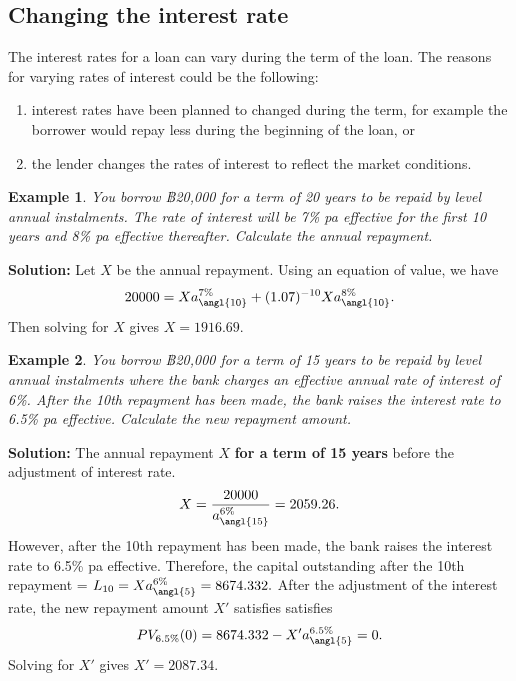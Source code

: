 \documentclass[
]{book}
\theoremstyle{definition}
\theoremstyle{definition}
\newtheorem{example}{Example}[chapter]
\theoremstyle{definition}
\theoremstyle{definition}
\theoremstyle{remark}
\begin{document}
\subsection{Changing the interest rate}\label{changing-the-interest-rate}

The interest rates for a loan can vary during the term of the loan. The
reasons for varying rates of interest could be the following:

\begin{enumerate}
\def\labelenumi{\arabic{enumi}.}
\item
  interest rates have been planned to changed during the term, for
  example the borrower would repay less during the beginning of the
  loan, or
\item
  the lender changes the rates of interest to reflect the market
  conditions.
\end{enumerate}

\begin{example}
\emph{You borrow ฿20,000 for a term of 20 years to be repaid by level annual
instalments. The rate of interest will be 7\% pa effective for the first
10 years and 8\% pa effective thereafter. Calculate the annual
repayment.}
\end{example}

\textbf{Solution:} Let \(X\) be the annual repayment. Using an equation of
value, we have
\[20000 = X a^{7\%}_{\angl{10}} + (1.07)^{-10} X a^{8\%}_{\angl{10}}.\]
Then solving for \(X\) gives \(X = 1916.69\).

\begin{example}
\emph{You borrow ฿20,000 for a term of 15 years to be repaid by level annual
instalments where the bank charges an effective annual rate of interest
of 6\%. After the 10th repayment has been made, the bank raises the
interest rate to 6.5\% pa effective. Calculate the new repayment amount.}
\end{example}

\textbf{Solution:} The annual repayment \(X\) \textbf{for a term of 15 years} before
the adjustment of interest rate.
\[X = \frac{20000}{a^{6\%}_{\angl{15}}} = 2059.26.\] However, after the
10th repayment has been made, the bank raises the interest rate to 6.5\%
pa effective. Therefore, the capital outstanding after the 10th
repayment = \(L_{10} = X a^{6\%}_{\angl{5}} = 8674.332.\) After the
adjustment of the interest rate, the new repayment amount \(X'\) satisfies
satisfies \[PV_{6.5\%}(0) = 8674.332 - X' a^{6.5\%}_{\angl{5}} = 0.\]
Solving for \(X'\) gives \(X' = 2087.34\).
\end{document}

